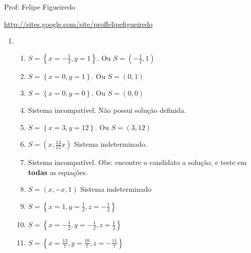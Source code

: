 \documentclass[a4paper]{article}
\begin{document}
\parbox[c]{.825\textwidth}{\raggedright%
{Prof: Felipe Figueiredo\par}
{\url{http://sites.google.com/site/proffelipefigueiredo}}

\vspace{1cm}
}



\begin{enumerate}
\item 

  \begin{enumerate}
  \item $S=\left\{ x = -\frac{1}{2}, y = 1 \right\}$. Ou $S=(-\frac{1}{2},1)$
  \item $S=\left\{ x = 0, y = 1 \right\}$. Ou $S=(0,1)$
  \item $S=\left\{ x = 0, y = 0\right\}$. Ou $S=(0,0)$
  \item Sistema incompatível. Não possui solução definida.
  \item $S=\left\{ x = 3, y = 12 \right\}$. Ou $S=(3,12)$
  \item $S=(x, \frac{13}{15}x)$ Sistema indeterminado.
  \item Sistema incompatível. Obs: encontre o candidato a solução, e
    teste em {\bf todas} as equações.
  \item $S=(x,-x,1)$ Sistema indeterminado
  \item $S=\left\{ x = 1, y = \frac{1}{2}, z = -\frac{1}{2}\right\}$
  \item $S=\left\{ x = -\frac{1}{2}, y = - \frac{1}{2}, z = \frac{1}{2} \right\}$
  \item $S=\left\{ x = \frac{13}{7}, y = \frac{10}{7}, z = -\frac{11}{7} \right\}$

  \end{enumerate}
\end{enumerate}
\end{document}
